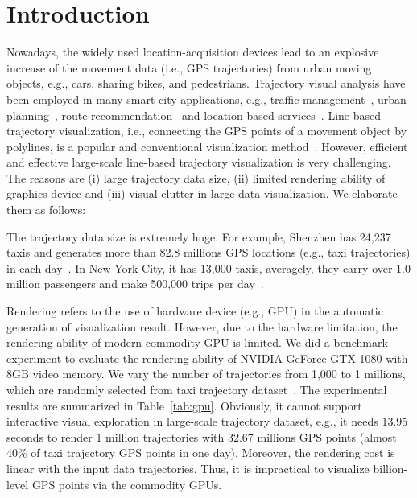 \section{Introduction}\label{sec:intro}
Nowadays, the widely used location-acquisition devices lead to an explosive increase of the movement data (i.e., GPS trajectories) from urban moving objects, e.g., cars, sharing bikes, and pedestrians.
Trajectory visual analysis have been employed in many smart city applications, e.g.,  traffic management~\cite{wang2014visual}, urban planning~\cite{tang2017efficient}, route recommendation~\cite{zheng2011learning} and location-based services~\cite{liu2016smartadp, zheng2010collaborative}.
Line-based trajectory visualization, i.e., connecting the GPS points of a movement object by polylines, is a popular and conventional visualization method~\cite{chen2015survey}.
However, efficient and effective large-scale line-based trajectory visualization is very challenging.
The reasons are (i) large trajectory data size, (ii) limited rendering ability of graphics device and (iii) visual clutter in large data visualization.
We elaborate them as follows:

 The trajectory data size is extremely huge.
For example, Shenzhen has 24,237 taxis and generates more than 82.8 millions GPS locations (e.g., taxi trajectories) in each day~\cite{sz}. %
In New York City, it has 13,000 taxis, averagely, they carry over 1.0 million passengers and make 500,000 trips per day~\cite{ferreira2013visual}.

Rendering refers to the use of hardware device (e.g., GPU) in the automatic generation of visualization result.
However, due to the hardware limitation, the rendering ability of modern commodity GPU is limited.
We did a benchmark experiment to evaluate the rendering ability of NVIDIA GeForce GTX 1080 with 8GB video memory.
We vary the number of trajectories from 1,000 to 1 millions, which are randomly selected from \pt{} taxi trajectory dataset~\cite{pt}.%
The experimental results are summarized in Table~\ref{tab:gpu}.
Obviously, it cannot support interactive visual exploration in large-scale trajectory dataset, e.g.,
it needs 13.95 seconds to render 1 million trajectories with 32.67 millions GPS points (almost 40\% of \sz{} taxi trajectory GPS points in one day).
Moreover, the rendering cost is linear with the input data trajectories.
Thus, it is impractical to visualize billion-level GPS points via the commodity GPUs.

